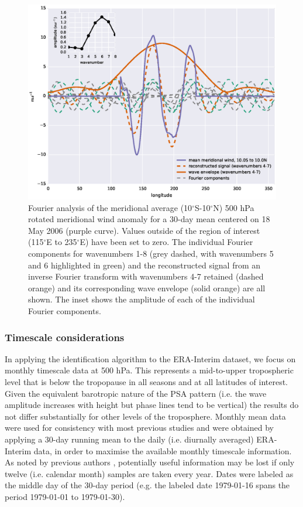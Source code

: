 \begin{figure}
\begin{center}
\includegraphics[width=0.84\columnwidth]{figures/psa/psa_check_2006-05-18_10S-10N_hilbert.eps}
\caption{\label{fig:transform}
Fourier analysis of the meridional average (10$^{\circ}$S-10$^{\circ}$N) 500 hPa rotated meridional wind anomaly for a 30-day mean centered on 18 May 2006 (purple curve). Values outside of the region of interest (115$^{\circ}$E to 235$^{\circ}$E) have been set to zero. The individual Fourier components for wavenumbers 1-8 (grey dashed, with wavenumbers 5 and 6 highlighted in green) and the reconstructed signal from an inverse Fourier transform with wavenumbers 4-7 retained (dashed orange) and its corresponding wave envelope (solid orange) are all shown. The inset shows the amplitude of each of the individual Fourier components.
}
\end{center}
\end{figure}

\subsubsection{Timescale considerations}

In applying the identification algorithm to the ERA-Interim dataset, we focus on monthly timescale data at 500 hPa. This represents a mid-to-upper tropospheric level that is below the tropopause in all seasons and at all latitudes of interest. Given the equivalent barotropic nature of the PSA pattern (i.e. the wave amplitude increases with height but phase lines tend to be vertical) the results do not differ substantially for other levels of the troposphere. Monthly mean data were used for consistency with most previous studies and were obtained by applying a 30-day running mean to the daily (i.e. diurnally averaged) ERA-Interim data, in order to maximise the available monthly timescale information. As noted by previous authors \citep[e.g.][]{Kidson1988}, potentially useful information may be lost if only twelve (i.e. calendar month) samples are taken every year. Dates were labeled as the middle day of the 30-day period (e.g. the labeled date 1979-01-16 spans the period 1979-01-01 to 1979-01-30).

